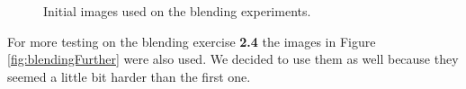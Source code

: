 \documentclass[12pt,a4paper]{article}
\begin{document}
\begin{figure}[!h]
{{		}
	}
	\caption{Initial images used on the blending experiments.}
	\label{fig:blending}
\end{figure}

For more testing on the blending exercise \textbf{2.4} the images in Figure \ref{fig:blendingFurther} were also used. We decided to use them as well because they seemed a little bit harder than the first one.

\begin{figure}[!h]
	\centering
	\quad
\end{figure}
\end{document}
